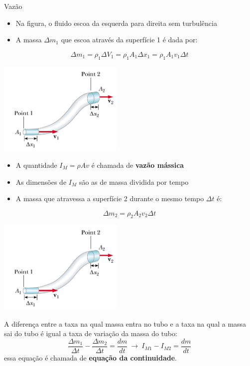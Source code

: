 \begin{frame}{Vazão}
    \begin{itemize}
        \item Na figura, o fluido escoa da esquerda para direita sem turbulência
        \item A massa $\Delta m_1$ que escoa através da superfície 1 é dada por:
    \end{itemize}
\[
\Delta m_1 = \rho_1 \Delta V_1 = \rho_1 A_1 \Delta x_1 = \rho_1 A_1 v_1 \Delta t
\]
\begin{center}
\includegraphics[width=0.45\textwidth]{images/tuboS}
\end{center}
\end{frame}

\begin{frame}
    \begin{itemize}
        \item A quantidade $I_M=\rho A v$ é chamada de \textbf{vazão mássica}
        \item As dimensões de $I_M$ são as de massa dividida por tempo
        \item A massa que atravessa a superfície 2 durante o mesmo tempo $\Delta t$ é:
    \end{itemize}
\[
\Delta m_2 = \rho_2 A_2 v_2 \Delta t
\]
\begin{center}
\includegraphics[width=0.45\textwidth]{images/tuboS}
\end{center}
\end{frame}

\begin{frame}[c]
A diferença entre a taxa na qual massa entra no tubo e a taxa na qual a massa
sai do tubo é igual a taxa de variação da massa do tubo:
\[
\frac{\Delta m_1}{\Delta t} - \frac{\Delta m_2}{\Delta t} = \frac{dm}{dt} ~\rightarrow~ I_{M1}-I_{M2} = \frac{dm}{dt}
\]
essa equação é chamada de \textbf{equação da continuidade}.
\end{frame}

